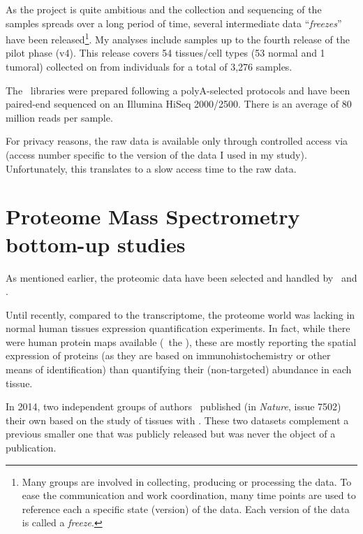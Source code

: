 As the project is quite ambitious and the collection
and sequencing of the samples spreads over a long period of time,
several intermediate data \enquote{\emph{freezes}} have been
released\footnote{Many groups are involved in collecting, producing or processing
the data. To ease the communication and work coordination,
many time points are used to reference each a specific state (version)
of the data. Each version of the data is called a \emph{freeze}.}.
My analyses include samples up to the fourth release of the pilot phase (v4).
This release covers 54 tissues/cell types (53 normal and 1 tumoral)
collected on from individuals for a total of 3,276 samples.\mybr\

The \Rnaseq\ libraries were prepared following a polyA-selected protocols
and have been paired-end sequenced on an Illumina HiSeq 2000/2500.
There is an average of 80 million reads per sample.\mybr\

For privacy reasons, the raw data is available only through controlled access via
 (access number specific to the version of the data I used
in my study).
Unfortunately, this translates to a slow access time to the raw data.\mybr\

\section[Proteome Mass Spectrometry bottom-up studies]%
{Proteome Mass Spectrometry bottom-up studies \quad}\label{sec:ProteoData}

As mentioned earlier,
the proteomic data have been selected and handled by \jyoti\ and \james.\mybr\

Until recently, compared to the transcriptome, the proteome world
was lacking in normal human tissues expression quantification
experiments. In fact, while there were human protein maps available
(\eg\ the ), these
are mostly reporting the spatial expression of proteins (as they are based
on immunohistochemistry or other means of identification) than quantifying
their (non-targeted) abundance in each tissue.\mybr\

In 2014, two independent groups of authors~
published (in \textit{Nature},
issue 7502) their own 
based on the study of tissues with \ms. These two datasets complement a previous
smaller one that was publicly released but was never the object of a publication.\mybr\

